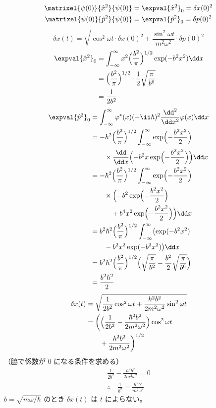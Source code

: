 \begin{align*}
\matrixel{\psi(0)}{\hat{x}^{2}}{\psi(0)}&=\expval{\hat{x}^{2}}_{0}=\delta x(0)^{2}\\
\matrixel{\psi(0)}{\hat{p}^{2}}{\psi(0)}&=\expval{\hat{p}^{2}}_{0}=\delta p(0)^{2}
\end{align*}
\[ \delta x(t)=\sqrt{\cos^{2}\omega t\cdot\delta x(0)^{2}+\frac{\sin^{2}\omega t}{m^{2}\omega^{2}}\cdot\delta p(0)^{2}} \]
\begin{align*}
\expval{\hat{x}^{2}}_{0}&=\int_{-\infty}^{\infty}x^{2}\Bigl(\frac{b^{2}}{\pi}\Bigr)^{1/2}\exp(-b^{2}x^{2})\dd x\\
&=\Bigl(\frac{b^{2}}{\pi}\Bigr)^{1/2}\cdot\frac{1}{2}\sqrt{\frac{\pi}{b^{6}}}\\
&=\frac{1}{2b^{2}}
\end{align*}
\begin{align*}
\expval{\hat{p}^{2}}_{0}&=\int_{-\infty}^{\infty}\varphi^{*}(x)(-\ii\hbar)^{2}\frac{\dd^{2}}{\dd x^{2}}\varphi(x)\dd x\\
&=-\hbar^{2}\Bigl(\frac{b^{2}}{\pi}\Bigr)^{1/2}\int_{-\infty}^{\infty}\exp\Bigl(-\frac{b^{2}x^{2}}{2}\Bigr)\\
&\qquad\times\frac{\dd}{\dd x}\Bigl(-b^{2}x\exp\Bigl(-\frac{b^{2}x^{2}}{2}\Bigr)\Bigr)\dd x\\
&=-\hbar^{2}\Bigl(\frac{b^{2}}{\pi}\Bigr)^{1/2}\int_{-\infty}^{\infty}\exp\Bigl(-\frac{b^{2}x^{2}}{2}\Bigr)\\
&\qquad\times\Bigl(-b^{2}\exp\Bigl(-\frac{b^{2}x^{2}}{2}\Bigr)\\
&\qquad\quad+b^{4}x^{2}\exp\Bigl(-\frac{b^{2}x^{2}}{2}\Bigr)\Bigr)\dd x\\
&=b^{2}\hbar^{2}\Bigl(\frac{b^{2}}{\pi}\Bigr)^{1/2}\int_{-\infty}^{\infty}\bigl(\exp(-b^{2}x^{2})\\
&\qquad-b^{2}x^{2}\exp(-b^{2}x^{2})\bigr)\dd x\\
&=b^{2}\hbar^{2}\Bigl(\frac{b^{2}}{\pi}\Bigr)^{1/2}\Bigl(\sqrt{\frac{\pi}{b^{2}}}-\frac{b^{2}}{2}\sqrt{\frac{\pi}{b^{6}}}\Bigr)\\
&=\frac{b^{2}\hbar^{2}}{2}
\end{align*}
\begin{align*}
\delta x(t)&=\sqrt{\frac{1}{2b^{2}}\cos^{2}\omega t+\frac{\hbar^{2}b^{2}}{2m^{2}\omega^{2}}\sin^{2}\omega t}\\
&=\biggl(\Bigl(\frac{1}{2b^{2}}-\frac{\hbar^{2}b^{2}}{2m^{2}\omega^{2}}\Bigr)\cos^{2}\omega t\\
&\qquad+\frac{\hbar^{2}b^{2}}{2m^{2}\omega^{2}}\biggr)^{1/2}
\end{align*}
（脇で係数が $0$ になる条件を求める）
\begin{gather*}
\frac{1}{2b^{2}}-\frac{\hbar^{2}b^{2}}{2m^{2}\omega^{2}}=0\\
\therefore\quad\frac{1}{b^{2}}=\frac{\hbar^{2}b^{2}}{m^{2}\omega^{2}}
\end{gather*}
$b=\sqrt{m\omega/\hbar}$ のとき $\delta x(t)$ は $t$ によらない。

